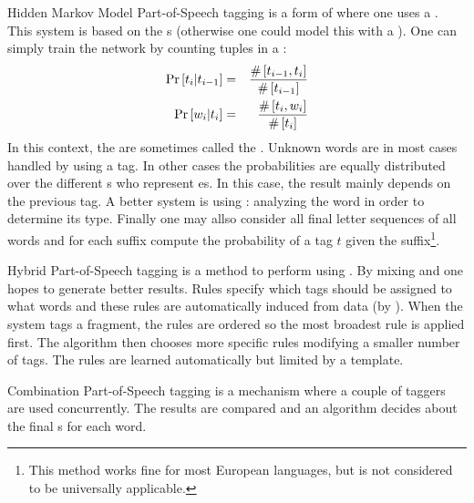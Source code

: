 \begin{df}{Hidden Markov Model Part-of-Speech tagging}
\sb{} is a form of  where one uses a . This system is based on the s (otherwise one could model this with a ). One can simply train the network by counting tuples in a :
\begin{eqnarray}
\Pr\left[t_i|t_{i-1}\right]&=&\displaystyle\frac{\#\left[t_{i-1},t_i\right]}{\#\left[t_{i-1}\right]}\\
\Pr\left[w_i|t_i\right]&=&\displaystyle\frac{\#\left[t_i,w_i\right]}{\#\left[t_i\right]}
\end{eqnarray}
In this context, the  are sometimes called the . Unknown words are in most cases handled by using a  tag. In other cases the probabilities are equally distributed over the different s who represent es. In this case, the result mainly depends on the previous tag. A better system is using : analyzing the word in order to determine its type. Finally one may allso consider all final letter sequences of all words and for each suffix compute the probability of a tag $t$ given the suffix\footnote{This method works fine for most European languages, but is not considered to be universally applicable.}.
\end{df}
\begin{df}{Hybrid Part-of-Speech tagging}
\sb{} is a method to perform  using . By mixing  and  one hopes to generate better results. Rules specify which tags should be assigned to what words and these rules are automatically induced from data (by ). When the system tags a fragment, the rules are ordered so the most broadest rule is applied first. The algorithm then chooses more specific rules modifying a smaller number of tags. The rules are learned automatically but limited by a template.
\end{df}
\begin{df}{Combination Part-of-Speech tagging}
\sb{} is a  mechanism where a couple of taggers are used concurrently. The results are compared and an algorithm decides about the final s for each word.
\end{df}
